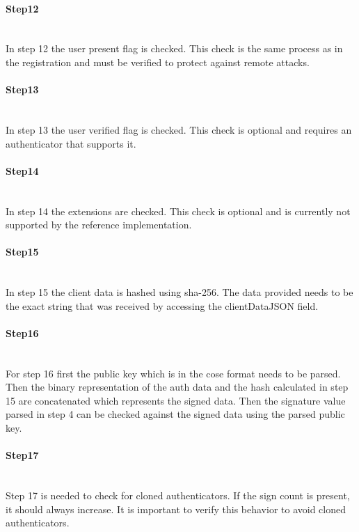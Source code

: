 \documentclass[a4paper, 11pt]{scrartcl}
\begin{document}
\paragraph{Step12}\hfill \\ 
In step 12 the user present flag is checked. This check is the same process as in the registration and must be verified to protect against remote attacks.

\paragraph{Step13}\hfill \\ 
In step 13 the user verified flag is checked. This check is optional and requires an authenticator that supports it. 

\paragraph{Step14}\hfill \\ 
In step 14 the extensions are checked. This check is optional and is currently not supported by the reference implementation.

\paragraph{Step15}\hfill \\ 
In step 15 the client data is hashed using \gls{sha-256}. The data provided needs to be the exact string that was received by accessing the clientDataJSON field.

\paragraph{Step16}\hfill \\ 
For step 16 first the public key which is in the \gls{cose} format needs to be parsed. Then the binary representation of the auth data and the hash calculated in step 15 are concatenated which represents the signed data. Then the signature value parsed in step 4 can be checked against the signed data using the parsed public key. 

\paragraph{Step17}\hfill \\ 
Step 17 is needed to check for cloned authenticators. If the sign count is present, it should always increase. It is important to verify this behavior to avoid cloned authenticators.
\end{document}
